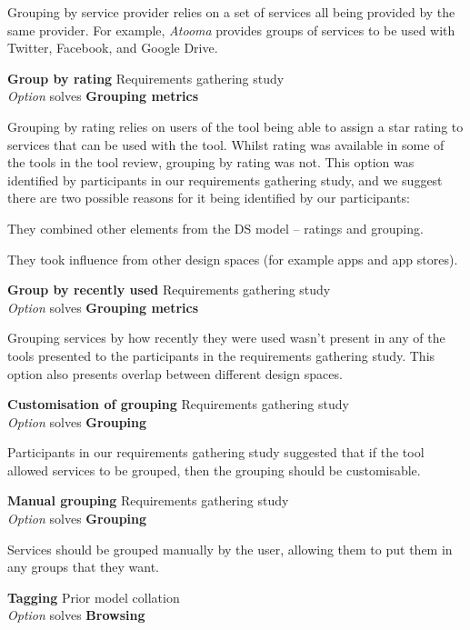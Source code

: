 Grouping by service provider relies on a set of services all being provided by the same provider. For example, \emph{Atooma} provides groups of services to be used with Twitter, Facebook, and Google Drive.

\textbf{Group by rating} \hfill Requirements gathering study \\ \emph{Option} \hfill solves \textbf{Grouping metrics}

Grouping by rating relies on users of the tool being able to assign a star rating to services that can be used with the tool. Whilst rating was available in some of the tools in the tool review, grouping by rating was not. This option was identified by participants in our requirements gathering study, and we suggest there are two possible reasons for it being identified by our participants:
\begin{itemize*}
	\item They combined other elements from the DS model -- ratings and grouping.
	\item They took influence from other design spaces (for example apps and app stores).
\end{itemize*}

\textbf{Group by recently used} \hfill Requirements gathering study \\ \emph{Option} \hfill solves \textbf{Grouping metrics}

Grouping services by how recently they were used wasn't present in any of the tools presented to the participants in the requirements gathering study. This option also presents overlap between different design spaces.

\textbf{Customisation of grouping} \hfill Requirements gathering study \\ \emph{Option} \hfill solves \textbf{Grouping}

Participants in our requirements gathering study suggested that if the tool allowed services to be grouped, then the grouping should be customisable.

\textbf{Manual grouping} \hfill Requirements gathering study \\ \emph{Option} \hfill solves \textbf{Grouping}

Services should be grouped manually by the user, allowing them to put them in any groups that they want.

\textbf{Tagging} \hfill Prior model collation \cite{Grammel2010} \\ \emph{Option} \hfill solves \textbf{Browsing}

